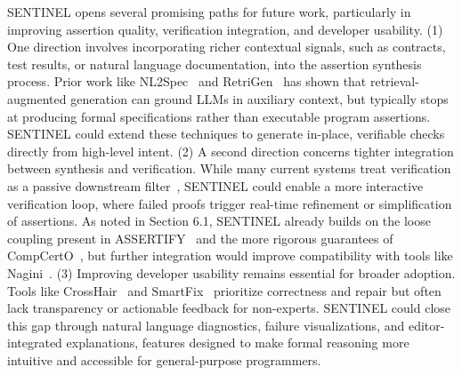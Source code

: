 \documentclass[8pt]{extarticle}
\begin{document}
SENTINEL opens several promising paths for future work, particularly in improving assertion quality, verification integration, and developer usability. (1) One direction involves incorporating richer contextual signals, such as contracts, test results, or natural language documentation, into the assertion synthesis process. Prior work like NL2Spec~\cite{cosler2023nl2spec} and RetriGen~\cite{zhang2024} has shown that retrieval-augmented generation can ground LLMs in auxiliary context, but typically stops at producing formal specifications rather than executable program assertions. SENTINEL could extend these techniques to generate in-place, verifiable checks directly from high-level intent. (2) A second direction concerns tighter integration between synthesis and verification. While many current systems treat verification as a passive downstream filter~\cite{Torkamani2024-Assertify, rak-amnouykit2023weakest}, SENTINEL could enable a more interactive verification loop, where failed proofs trigger real-time refinement or simplification of assertions. As noted in Section 6.1, SENTINEL already builds on the loose coupling present in ASSERTIFY~\cite{Torkamani2024-Assertify} and the more rigorous guarantees of CompCertO~\cite{KoenigShao2021CompCertO}, but further integration would improve compatibility with tools like Nagini~\cite{eilers2018}. (3) Improving developer usability remains essential for broader adoption. Tools like CrossHair~\cite{CrossHairTool} and SmartFix~\cite{SoOh2023SmartFix} prioritize correctness and repair but often lack transparency or actionable feedback for non-experts. SENTINEL could close this gap through natural language diagnostics, failure visualizations, and editor-integrated explanations, features designed to make formal reasoning more intuitive and accessible for general-purpose programmers.




\end{document}
